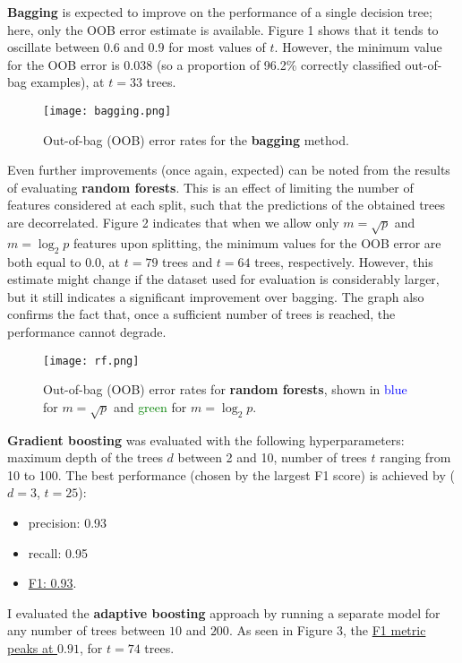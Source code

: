 \documentclass[11pt]{article}
\numberwithin{equation}{section}
\begin{document}
\textbf{Bagging} is expected to improve on the performance of a single decision tree; here, only the OOB error estimate is available. Figure 1 shows that it tends to oscillate between $0.6$ and $0.9$ for most values of $t$. However, the minimum value for the OOB error is $0.038$ (so a proportion of 96.2\% correctly classified out-of-bag examples), at $t = 33$ trees.

\begin{figure}[H]
\texttt{[image: bagging.png]}
\caption{Out-of-bag (OOB) error rates for the \textbf{bagging} method.}
\end{figure}

Even further improvements (once again, expected) can be noted from the results of evaluating \textbf{random forests}. This is an effect of limiting the number of features considered at each split, such that the predictions of the obtained trees are decorrelated. Figure 2 indicates that when we allow only $m = \sqrt{p}$ and $m = \log_2p$ features upon splitting, the minimum values for the OOB error are both equal to $0.0$, at $t = 79$ trees and $t = 64$ trees, respectively. However, this estimate might change if the dataset used for evaluation is considerably larger, but it still indicates a significant improvement over bagging. The graph also confirms the fact that, once a sufficient number of trees is reached, the performance cannot degrade.

\begin{figure}[H]
\texttt{[image: rf.png]}
\caption{Out-of-bag (OOB) error rates for \textbf{random forests}, shown in \textcolor{blue}{blue} for $m = \sqrt{p}$ and \textcolor{green}{green} for $m = \log_2p$.}
\end{figure}

\textbf{Gradient boosting} was evaluated with the following hyperparameters: maximum depth of the trees $d$ between 2 and 10, number of trees $t$ ranging from 10 to 100. The best performance (chosen by the largest F1 score) is achieved by ($d = 3$, $t = 25$):
\begin{itemize}
\item precision: 0.93
\item recall: 0.95
\item \underline{F1: 0.93}.
\end{itemize}

I evaluated the \textbf{adaptive boosting} approach by running a separate model for any number of trees between $10$ and $200$. As seen in Figure 3, the \underline{F1 metric peaks at $0.91$}, for $t = 74$ trees.
\end{document}
